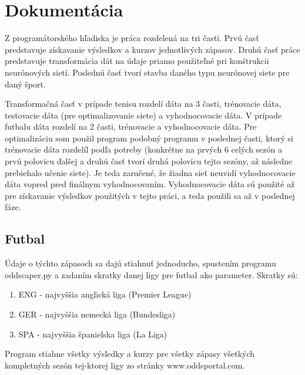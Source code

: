 \chapter{Dokumentácia} \label{docu}

Z programátorského hľadiska je práca rozdelená na tri časti. 
Prvú časť predstavuje získavanie výsledkov a kurzov jednotlivých zápasov. 
Druhú časť práce predstavuje transformácia dát na údaje priamo použiteľné pri konštrukcii neurónových sietí.
Poslednú časť tvorí stavba daného typu neurónovej siete pre daný šport.

Transformačná časť v prípade tenisu rozdelí dáta na 3 časti, trénovacie dáta, testovacie dáta (pre optimalizovanie siete) a vyhodnocovacie dáta.
V prípade futbalu dáta rozdelí na 2 časti, trénovacie a vyhodnocovacie dáta.
Pre optimalizáciu som použil program podobný programu v poslednej časti, ktorý si trénovacie dáta rozdelíl podľa potreby (konkrétne na prvých 6 celých sezón a prvú polovicu ďalšej a druhú časť tvorí druhá polovicu tejto sezóny, až následne prebiehalo učenie siete).
Je teda zaručené, že žiadna sieť neuvidí vyhodnocovacie dáta vopred pred finálnym vyhodnocovaním.
Vyhodnocovacie dáta sú použité až pre získavanie výsledkov použitých v tejto práci, a teda použili sa až v poslednej fáze.

\section{Futbal}

Údaje o týchto zápasoch sa dajú stiahnuť jednoducho, spustením programu oddscaper.py a zadaním skratky danej ligy pre futbal ako parameter.
Skratky sú:
\begin{enumerate}
\item ENG - najvyššia anglická liga (Premier League)
\item GER - najvyššia nemecká liga (Bundesliga)
\item SPA - najvyššia španielska liga (La Liga)
\end{enumerate}
Program stiahne všetky výsledky a kurzy pre všetky zápasy všetkých kompletných sezón tej-ktorej ligy zo stránky www.oddsportal.com.

